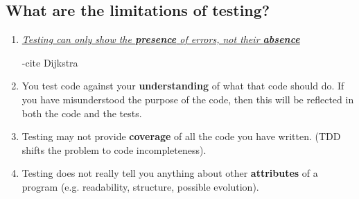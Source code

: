 \subsection{What are the limitations of testing?}
\begin{enumerate}
   \item 
   \begin{center}
      \ul{\textit{Testing can only show the \textbf{presence} of errors, not their \textbf{absence}}}
   \end{center}
   {\footnotesize\color{gray}-cite Dijkstra}
   \item You test code against your \textbf{understanding} of what that code should do. If you have misunderstood the purpose of the code, then this will be reflected in both the code and the tests.
   \item Testing may not provide \textbf{coverage} of all the code you have written. (TDD shifts the problem to code incompleteness).
   \item Testing does not really tell you anything about other \textbf{attributes} of a program (e.g. readability, structure, possible evolution).
\end{enumerate}


